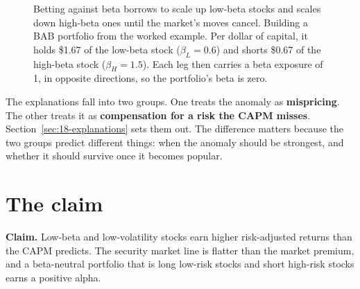 \begin{figure}[htbp]
\centering
{}
\caption{Betting against beta borrows to scale up low-beta stocks and scales down high-beta ones until the market's moves cancel. Building a BAB portfolio from the worked example. Per dollar of capital, it holds \$1.67 of the low-beta stock ($\beta_L = 0.6$) and shorts \$0.67 of the high-beta stock ($\beta_H = 1.5$). Each leg then carries a beta exposure of 1, in opposite directions, so the portfolio's beta is zero.}
\label{fig:18-bab}
\end{figure}

The explanations fall into two groups. One treats the anomaly as \textbf{mispricing}. The other treats it as \textbf{compensation for a risk the CAPM misses}. Section~\ref{sec:18-explanations} sets them out. The difference matters because the two groups predict different things: when the anomaly should be strongest, and whether it should survive once it becomes popular.

\section{The claim}
\label{sec:18-claim}

\begin{callout}
\textbf{Claim.} Low-beta and low-volatility stocks earn higher risk-adjusted returns than the CAPM predicts. The security market line is flatter than the market premium, and a beta-neutral portfolio that is long low-risk stocks and short high-risk stocks earns a positive alpha.
\end{callout}

